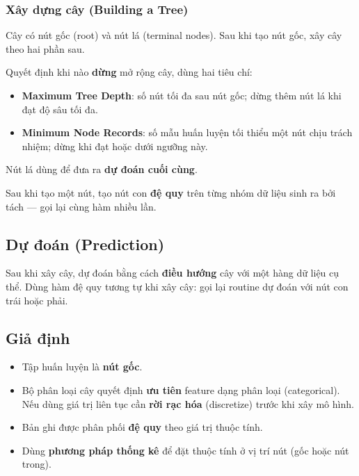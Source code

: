 \subsubsection{Xây dựng cây (Building a Tree)}

\begin{ynghia}[title={Nút gốc và nút lá}]
Cây có nút gốc (root) và nút lá (terminal nodes).
Sau khi tạo nút gốc, xây cây theo hai phần sau.
\end{ynghia}

\begin{phuongphap}[title={Phần 1: Tạo nút lá (terminal node)}]
Quyết định khi nào \textbf{dừng} mở rộng cây, dùng hai tiêu chí:
\begin{itemize}
  \item \textbf{Maximum Tree Depth}: số nút tối đa sau nút gốc; dừng thêm nút lá khi đạt độ sâu tối đa.
  \item \textbf{Minimum Node Records}: số mẫu huấn luyện tối thiểu một nút chịu trách nhiệm; dừng khi đạt hoặc dưới ngưỡng này.
\end{itemize}
Nút lá dùng để đưa ra \textbf{dự đoán cuối cùng}.
\end{phuongphap}

\begin{phuongphap}[title={Phần 2: Tách đệ quy (Recursive Splitting)}]
Sau khi tạo một nút, tạo nút con \textbf{đệ quy} trên từng nhóm dữ liệu sinh ra bởi tách --- gọi lại cùng hàm nhiều lần.
\end{phuongphap}

\subsection{Dự đoán (Prediction)}

\begin{phuongphap}[title={Điều hướng trên cây}]
Sau khi xây cây, dự đoán bằng cách \textbf{điều hướng} cây với một hàng dữ liệu cụ thể.
Dùng hàm đệ quy tương tự khi xây cây: gọi lại routine dự đoán với nút con trái hoặc phải.
\end{phuongphap}

\subsection{Giả định}

\begin{luuy}[title={Giả định khi tạo decision tree}]
\begin{itemize}
  \item Tập huấn luyện là \textbf{nút gốc}.
  \item Bộ phân loại cây quyết định \textbf{ưu tiên} feature dạng phân loại (categorical). Nếu dùng giá trị liên tục cần \textbf{rời rạc hóa} (discretize) trước khi xây mô hình.
  \item Bản ghi được phân phối \textbf{đệ quy} theo giá trị thuộc tính.
  \item Dùng \textbf{phương pháp thống kê} để đặt thuộc tính ở vị trí nút (gốc hoặc nút trong).
\end{itemize}
\end{luuy}

